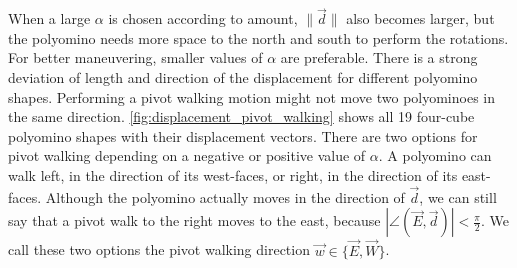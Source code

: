 When a large $\alpha$ is chosen according to amount, $\lVert \vec{d} \rVert$ also becomes larger, but the polyomino needs more space to the north and south to perform the rotations.
For better maneuvering, smaller values of $\alpha$ are preferable.
There is a strong deviation of length and direction of the displacement for different polyomino shapes.
Performing a pivot walking motion might not move two polyominoes in the same direction.
\autoref{fig:displacement_pivot_walking} shows all 19 four-cube polyomino shapes with their displacement vectors.
There are two options for pivot walking depending on a negative or positive value of $\alpha$.
A polyomino can walk left, in the direction of its west-faces, or right, in the direction of its east-faces.
Although the polyomino actually moves in the direction of $\vec{d}$, we can still say that a pivot walk to the right moves to the east, because $\left| \angle \left( \vec{E}, \vec{d} \right) \right| < \frac{\pi}{2}$.
We call these two options the pivot walking direction $\vec{w} \in \{\vec{E}, \vec{W}\}$.
